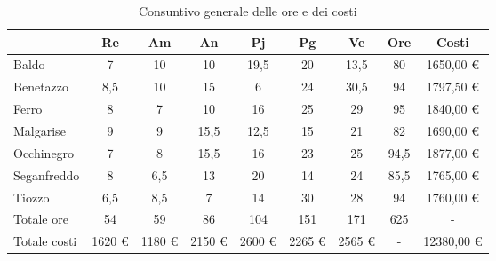 \begin{table}[!h]
    \centering
    \begin{tabular}{ | l | c | c | c | c | c | c || c | c | }
        \hline
        \textbf{} & \textbf{Re} & \textbf{Am} &\textbf{An} & \textbf{Pj} & \textbf{Pg} & \textbf{Ve} & \textbf{Ore} & \textbf{Costi} \\
        \hline
        Baldo        &    7   &   10   &   10   &   19,5 &   20   &   13,5 &   80   &  1650,00 € \\
        Benetazzo    &    8,5 &   10   &   15   &    6   &   24   &   30,5 &   94   &  1797,50 € \\
        Ferro        &    8   &    7   &   10   &   16   &   25   &   29   &   95   &  1840,00 € \\
        Malgarise    &    9   &    9   &   15,5 &   12,5 &   15   &   21   &   82   &  1690,00 € \\
        Occhinegro   &    7   &    8   &   15,5 &   16   &   23   &   25   &   94,5 &  1877,00 € \\
        Seganfreddo  &    8   &    6,5 &   13   &   20   &   14   &   24   &   85,5 &  1765,00 € \\
        Tiozzo       &    6,5 &    8,5 &    7   &   14   &   30   &   28   &   94   &  1760,00 € \\
        \hline
        Totale ore   &   54   &   59   &   86   &  104   &  151   &  171   &  625   &     -      \\
        \hline
        Totale costi & 1620 € & 1180 € & 2150 € & 2600 € & 2265 € & 2565 € &    -   & 12380,00 € \\
        \hline
    \end{tabular}
    \caption{Consuntivo generale delle ore e dei costi}
\end{table}

